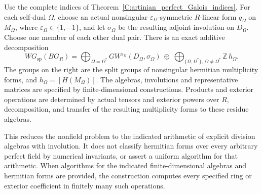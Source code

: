 \begin{theorem}
\label{C:artinian_perfect_WG_reduction}
Use the complete indices of
Theorem~\ref{C:artinian_perfect_Galois_indices}.
For each self-dual $\Omega$, choose an actual nonsingular
$\varepsilon_\Omega$-symmetric $R$-linear form
$q_\Omega$ on $M_\Omega$, where
$\varepsilon_\Omega\in\{1,-1\}$, and let $\sigma_\Omega$ be
the resulting adjoint involution on $D_\Omega$.
Choose one member of each other dual pair.
There is an exact additive decomposition
\[
 WG_{\mathrm{sp}}(BG_R)=
 \bigoplus_{\Omega=\Omega^*}
      GW^{\varepsilon_\Omega}(D_\Omega,\sigma_\Omega)
 \ \oplus\
 \bigoplus_{\{\Omega,\Omega^*\},\,\Omega\ne\Omega^*}
      \mathbb Z\,h_\Omega .                              \tag{C.3.P5}
\]
The groups on the right are the split groups of nonsingular
hermitian multiplicity forms, and
$h_\Omega=[H(M_\Omega)]$.
The algebras, involutions and representative matrices are
specified by finite-dimensional constructions. Products
and exterior operations are determined by actual tensors
and exterior powers over $R$, decomposition, and transfer
of the resulting multiplicity forms to these residue algebras.

This reduces the nonfield problem to the indicated arithmetic
of explicit division algebras with involution. It does not
classify hermitian forms over every arbitrary perfect field
by numerical invariants, or assert a uniform algorithm for
that arithmetic. When algorithms for the indicated
finite-dimensional algebras and hermitian forms are provided,
the construction computes every specified ring or exterior
coefficient in finitely many such operations.
\end{theorem}
